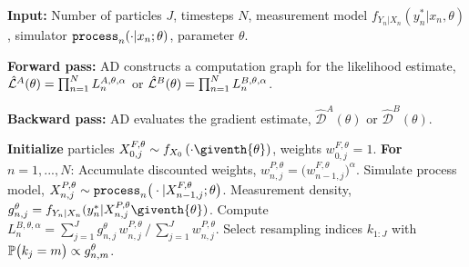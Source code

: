 \documentclass[11pt]{article}
\begin{document}
\begin{algorithm}[htbp!]
	\caption{DMOP-$\alpha$}
    \label{alg:dmop}
	     \textbf{Input:} Number of particles $J$, timesteps $N$, measurement model $f_{Y_n|X_n}(y_n^*|x_n, \theta)$, simulator $\texttt{process}_n(\cdot|x_n; \theta)$, parameter $\theta$.
      
             \textbf{Forward pass:} AD constructs a computation graph for the likelihood estimate, $\hat{\mathcal{L}}^A(\theta) = \prod_{n=1}^N L_n^{A,\theta,\alpha}$ or $\hat{\mathcal{L}}^B(\theta) = \prod_{n=1}^N L_n^{B,\theta,\alpha}$. 
            
        \textbf{Backward pass:} AD evaluates the gradient estimate, $\hat{\mathcal{D}}^A(\theta)$ or  $\hat{\mathcal{D}}^B(\theta)$.
            
		\textbf{Initialize } particles ${X}_{0,j}^{F,\theta}\sim {f}_{{X}_{0}}\left(\cdot\giventh{\theta}\right)$, weights $w^{F,\theta}_{0,j}= 1$. \newline
		\textbf{For} $n=1,...,N$: \newline
            \hspace*{4mm} Accumulate discounted weights, $w_{n,j}^{P,\theta} = \big(w_{n-1,j}^{F,\theta}\big)^\alpha$.\newline
            \hspace*{4mm} Simulate process model,
            ${X}_{n,j}^{P,\theta}\sim \texttt{process}_n\big(\cdot|{X}_{n-1,j}^{F, \theta};{\theta}\big)$. \newline
            \hspace*{4mm} Measurement density,
            $g^{\theta}_{n,j}={f}_{{Y}_{n}|{X}_{n}}(y_{n}^{*}|{X}_{n,j}^{P,\theta}\giventh{\theta})$. \newline
            \hspace*{4mm} Compute $L_n^{B,\theta,\alpha} ={\sum_{j=1}^Jg^\theta_{n,j} \, w^{P,\theta}_{n,j}}\, \big/\, {\sum_{j=1}^J  w^{P,\theta}_{n,j}}$. \newline
            \hspace*{4mm} Select resampling indices $k_{1:J}$ with $\mathbb{P}\big(k_{j}=m\big) \propto g^{\theta}_{n,m}$. \newline

\end{algorithm}
\end{document}
